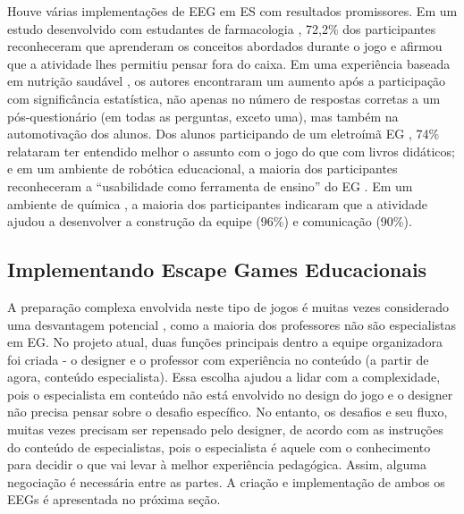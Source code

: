 Houve várias implementações de EEG em ES com resultados promissores. Em um estudo desenvolvido com estudantes de farmacologia \citep{hermanns_using_2017}, 72,2\% dos participantes reconheceram que aprenderam os conceitos abordados durante o jogo e afirmou que a atividade lhes permitiu pensar fora do caixa. Em uma experiência baseada em nutrição saudável \citep{yachin_promoting_2019}, os autores encontraram um aumento após a participação com significância estatística, não apenas no número de respostas corretas a um pós-questionário (em todas as perguntas, exceto uma), mas também na automotivação dos alunos. Dos alunos participando de um eletroímã EG \citep{hou_exploring_2012}, 74\% relataram ter entendido melhor o assunto com o jogo do que com livros didáticos; e em um ambiente de robótica educacional, a maioria dos participantes reconheceram a “usabilidade como ferramenta de ensino” do EG \citep{giang_exploring_2020}. Em um ambiente de química \citep{dietrich_escape_2018}, a maioria dos participantes indicaram que a atividade ajudou a desenvolver a construção da equipe (96\%) e comunicação (90\%).

\subsection{Implementando Escape Games Educacionais}

A preparação complexa envolvida neste tipo de jogos é muitas vezes considerado uma desvantagem potencial \citep{wiemker_escape_2015}, como a maioria dos professores não são especialistas em EG. No projeto atual, duas funções principais dentro a equipe organizadora foi criada - o designer e o professor com experiência no conteúdo (a partir de agora, conteúdo especialista). Essa escolha ajudou a lidar com a complexidade, pois o especialista em conteúdo não está envolvido no design do jogo e o designer não precisa pensar sobre o desafio específico. No entanto, os desafios e seu fluxo, muitas vezes precisam ser repensado pelo designer, de acordo com as instruções do conteúdo de especialistas, pois o especialista é aquele com o conhecimento para decidir o que vai levar à melhor experiência pedagógica. Assim, alguma negociação é necessária entre as partes. A criação e implementação de ambos os EEGs é apresentada no próxima seção.

